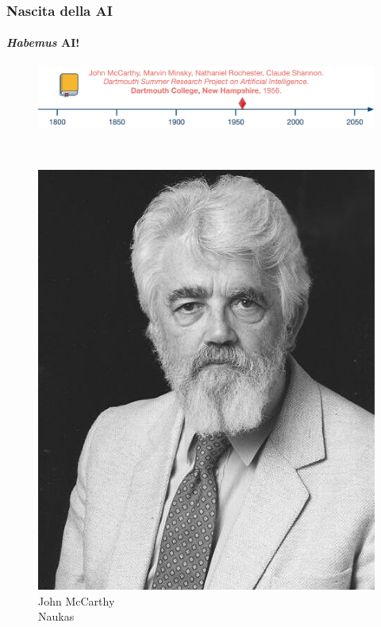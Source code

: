 \begin{frame}[t] \frametitle{Nascita della AI}
{\scriptsize
	\onslide<1->
		\framesubtitle{\textit{Habemus} AI!}
		\vspace*{-.5cm}
		\begin{minipage}[t]{\textwidth}
			\begin{figure}[ht]
				\centering
				\includegraphics[width=\textwidth]{img/AI-timeline-1956-2-alt.png}
			\end{figure}
		\end{minipage}
    \\\vspace*{.3cm}
	\begin{minipage}[t]{\textwidth}
		\begin{minipage}[t]{0.24\textwidth}
			\centering
			\begin{figure}[ht]
				\includegraphics[width=.73\textwidth]{img/John-McCarthy.jpg}
				{\tiny\\John McCarthy\\\textcopyright Naukas}
			\end{figure}
		\end{minipage}

\end{minipage}}
\end{frame}
